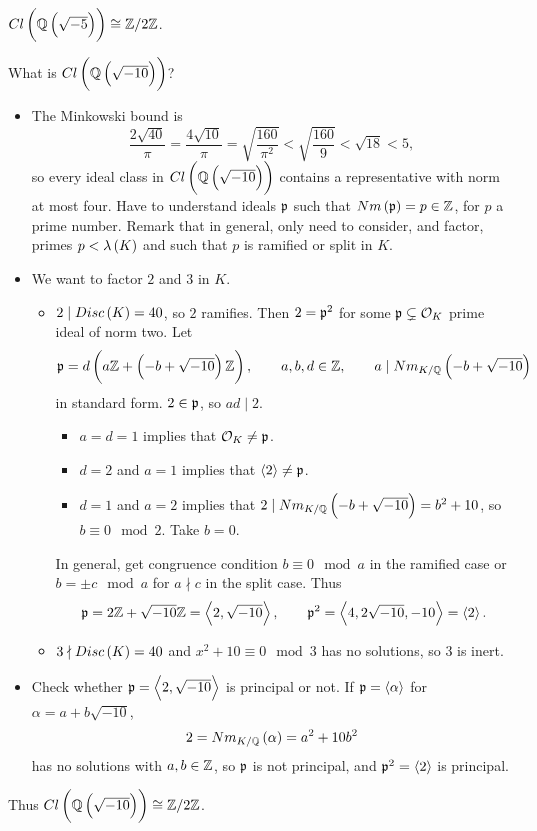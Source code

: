 \begin{example*}
$ Cl\br{\Q\br{\sqrt{-5}}} \cong \Z / 2\Z $.
\end{example*}

\begin{example*}
What is $ Cl\br{\Q\br{\sqrt{-10}}} $?
\begin{itemize}
\item The Minkowski bound is
$$ \dfrac{2\sqrt{40}}{\pi} = \dfrac{4\sqrt{10}}{\pi} = \sqrt{\dfrac{160}{\pi^2}} < \sqrt{\dfrac{160}{9}} < \sqrt{18} < 5, $$
so every ideal class in $ Cl\br{\Q\br{\sqrt{-10}}} $ contains a representative with norm at most four. Have to understand ideals $ \mathfrak{p} $ such that $ Nm\br{\pp} = p \in \Z $, for $ p $ a prime number. Remark that in general, only need to consider, and factor, primes $ p < \lambda\br{K} $ and such that $ p $ is ramified or split in $ K $.
\item We want to factor $ 2 $ and $ 3 $ in $ K $.
\begin{itemize}
\item $ 2 \mid Disc\br{K} = 40 $, so $ 2 $ ramifies. Then $ 2 = \mathfrak{p}^2 $ for some $ \mathfrak{p} \subsetneq \mathcal{O}_K $ prime ideal of norm two. Let
$$ \pp = d\br{a\Z + \br{-b + \sqrt{-10}}\Z}, \qquad a, b, d \in \Z, \qquad a \mid Nm_{K / \Q}\br{-b + \sqrt{-10}} $$
in standard form. $ 2 \in \mathfrak{p} $, so $ ad \mid 2 $.
\begin{itemize}
\item $ a = d = 1 $ implies that $ \mathcal{O}_K \ne \mathfrak{p} $.
\item $ d = 2 $ and $ a = 1 $ implies that $ \left\langle 2 \right\rangle \ne \mathfrak{p} $.
\item $ d = 1 $ and $ a = 2 $ implies that $ 2 \mid Nm_{K / \Q}\br{-b + \sqrt{-10}} = b^2 + 10 $, so $ b \equiv 0 \mod 2 $. Take $ b = 0 $.
\end{itemize}
In general, get congruence condition $ b \equiv 0 \mod a $ in the ramified case or $ b = \pm c \mod a $ for $ a \nmid c $ in the split case. Thus
$$ \mathfrak{p} = 2\mathbb{Z} + \sqrt{-10}\mathbb{Z} = \left\langle 2, \sqrt{-10} \right\rangle, \qquad \mathfrak{p}^2 = \left\langle 4, 2\sqrt{-10}, -10 \right\rangle = \left\langle 2 \right\rangle. $$
\item $ 3 \nmid Disc\br{K} = 40 $ and $ x^2 + 10 \equiv 0 \mod 3 $ has no solutions, so $ 3 $ is inert.
\end{itemize}
\item Check whether $ \mathfrak{p} = \left\langle 2, \sqrt{-10} \right\rangle $ is principal or not. If $ \mathfrak{p} = \left\langle \alpha \right\rangle $ for $ \alpha = a + b\sqrt{-10} $,
$$ 2 = Nm_{K / \Q}\br{\alpha} = a^2 + 10b^2 $$
has no solutions with $ a, b \in \mathbb{Z} $, so $ \mathfrak{p} $ is not principal, and $ \mathfrak{p}^2 = \left\langle 2 \right\rangle $ is principal.
\end{itemize}
Thus $ Cl\br{\Q\br{\sqrt{-10}}} \cong \Z / 2\Z $.
\end{example*}

